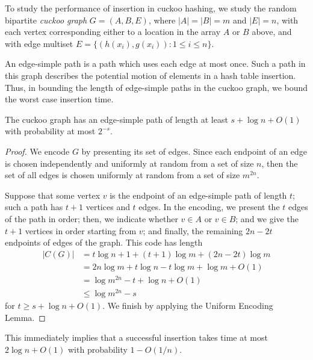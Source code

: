 \documentclass{patmorin}
\begin{document}
To study the performance of insertion in cuckoo hashing, we study the
random bipartite \emph{cuckoo graph} $G = (A, B, E)$, where $|A| = |B|
= m$ and $|E| = n$, with each vertex corresponding either to a
location in the array $A$ or $B$ above, and with edge multiset $E =
\{(h(x_i), g(x_i)) : 1 \leq i \leq n\}$.

An edge-simple path is a path which uses each edge at most once. Such
a path in this graph describes the potential motion of elements in a
hash table insertion. Thus, in bounding the length of edge-simple
paths in the cuckoo graph, we bound the worst case insertion time.

\begin{lem}
  The cuckoo graph has an edge-simple path of length at least
  $s + \log n + O(1)$ with probability at most $2^{-s}$.
\end{lem}
\begin{proof}
  We encode $G$ by presenting its set of edges. Since each endpoint of
  an edge is chosen independently and uniformly at random from a set
  of size $n$, then the set of all edges is chosen uniformly at random
  from a set of size $m^{2n}$.

  Suppose that some vertex $v$ is the endpoint of an edge-simple path
  of length $t$; such a path has $t + 1$ vertices and $t$ edges. In
  the encoding, we present the $t$ edges of the path in order; then,
  we indicate whether $v \in A$ or $v \in B$; and we give the $t + 1$
  vertices in order starting from $v$; and finally, the remaining
  $2n - 2t$ endpoints of edges of the graph. This code has length
  \begin{align*}
    |C(G)| &= t \log n + 1 + (t + 1) \log m + (2n - 2t) \log m\\
           &= 2n \log m + t \log n - t \log m + \log m + O(1) \\
           &= \log m^{2n} - t + \log n + O(1) \tag{since $m = 2n$} \\
           &\leq \log m^{2n} - s
  \end{align*}
  for $t \geq s + \log n + O(1)$. We finish by applying the Uniform
  Encoding Lemma.
\end{proof}
This immediately implies that a successful insertion takes time at
most $2 \log n + O(1)$ with probability $1 - O(1/n)$.
\end{document}
